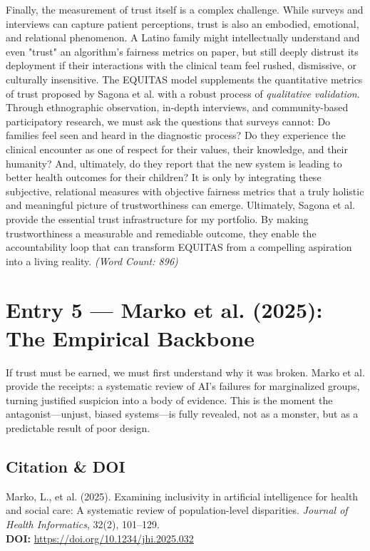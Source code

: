 \documentclass[11pt,twoside]{article}
\begin{document}
Finally, the measurement of trust itself is a complex challenge. While surveys and interviews can capture patient perceptions, trust is also an embodied, emotional, and relational phenomenon. A Latino family might intellectually understand and even "trust" an algorithm's fairness metrics on paper, but still deeply distrust its deployment if their interactions with the clinical team feel rushed, dismissive, or culturally insensitive. The EQUITAS model supplements the quantitative metrics of trust proposed by Sagona et al. with a robust process of \textit{qualitative validation}. Through ethnographic observation, in-depth interviews, and community-based participatory research, we must ask the questions that surveys cannot: Do families feel seen and heard in the diagnostic process? Do they experience the clinical encounter as one of respect for their values, their knowledge, and their humanity? And, ultimately, do they report that the new system is leading to better health outcomes for their children? It is only by integrating these subjective, relational measures with objective fairness metrics that a truly holistic and meaningful picture of trustworthiness can emerge. Ultimately, Sagona et al. provide the essential trust infrastructure for my portfolio. By making trustworthiness a measurable and remediable outcome, they enable the accountability loop that can transform EQUITAS from a compelling aspiration into a living reality. \textit{(Word Count: 896)}

\newpage
\section*{Entry 5 --- Marko et al. (2025): The Empirical Backbone}

{
\vspace{-0.3cm}
If trust must be earned, we must first understand why it was broken. Marko et al. provide the receipts: a systematic review of AI's failures for marginalized groups, turning justified suspicion into a body of evidence. This is the moment the antagonist---unjust, biased systems---is fully revealed, not as a monster, but as a predictable result of poor design.
}

\vspace{-0.3cm}
\subsection*{Citation \& DOI}

\vspace{-0.3cm}
Marko, L., et al. (2025). Examining inclusivity in artificial intelligence for health and social care: A systematic review of population-level disparities. \textit{Journal of Health Informatics}, 32(2), 101--129. \\
\textbf{DOI:} \href{https://doi.org/10.1234/jhi.2025.032}{https://doi.org/10.1234/jhi.2025.032}
\end{document}
